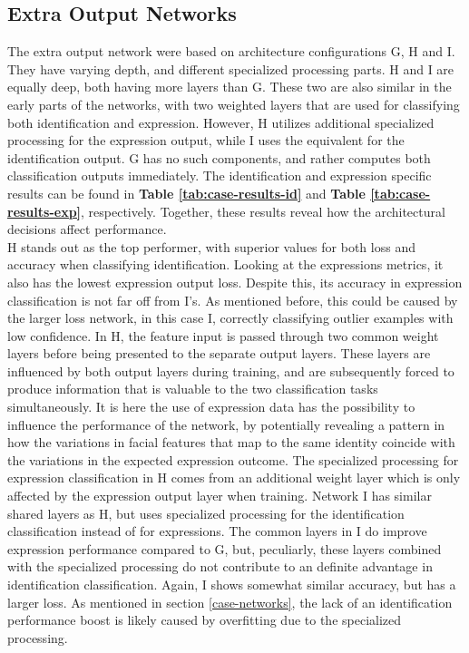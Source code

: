 \subsection{Extra Output Networks}

The extra output network were based on architecture configurations G, H and I. They have varying depth, and different specialized processing parts. H and I are equally deep, both having more layers than G. These two are also similar in the early parts of the networks, with two weighted layers that are used for classifying both identification and expression. However, H utilizes additional specialized processing for the expression output, while I uses the equivalent for the identification output. G has no such components, and rather computes both classification outputs immediately. The identification and expression specific results can be found in \textbf{Table \ref{tab:case-results-id}} and \textbf{Table \ref{tab:case-results-exp}}, respectively. Together, these results reveal how the architectural decisions affect performance. \\

\noindent H stands out as the top performer, with superior values for both loss and accuracy when classifying identification. Looking at the expressions metrics, it also has the lowest expression output loss. Despite this, its accuracy in expression classification is not far off from I's. As mentioned before, this could be caused by the larger loss network, in this case I, correctly classifying outlier examples with low confidence. In H, the feature input is passed through two common weight layers before being presented to the separate output layers. These layers are influenced by both output layers during training, and are subsequently forced to produce information that is valuable to the two classification tasks simultaneously. It is here the use of expression data has the possibility to influence the performance of the network, by potentially revealing a pattern in how the variations in facial features that map to the same identity coincide with the variations in the expected expression outcome. The specialized processing for expression classification in H comes from an additional weight layer which is only affected by the expression output layer when training. Network I has similar shared layers as H, but uses specialized processing for the identification classification instead of for expressions. The common layers in I do improve expression performance compared to G, but, peculiarly, these layers combined with the specialized processing do not contribute to an definite advantage in identification classification. Again, I shows somewhat similar accuracy, but has a larger loss. As mentioned in section \ref{case-networks}, the lack of an identification performance boost is likely caused by overfitting due to the specialized processing. 

